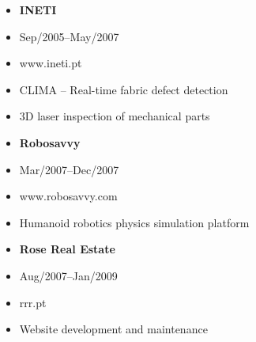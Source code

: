 \documentclass[a4paper,english]{article}
\begin{document}
\noindent
\begin{minipage}[t]{0.5\linewidth}
    \begin{itemize}
    \setlength{\itemsep}{-1mm}
        \item[] {\bf INETI}
        \item[] Sep/2005--May/2007
        \item[] www.ineti.pt
    \end{itemize}
\end{minipage}
\begin{minipage}[t]{0.5\linewidth}
    \begin{itemize}
    \setlength{\itemsep}{-1mm}
        \item[] CLIMA -- Real-time fabric defect detection
        \item[] 3D laser inspection of mechanical parts
    \end{itemize}
\end{minipage}
\vspace{0.5cm}
\begin{minipage}[t]{0.5\linewidth}
    \begin{itemize}
    \setlength{\itemsep}{-1mm}
        \item[] {\bf Robosavvy}
        \item[] Mar/2007--Dec/2007
        \item[] www.robosavvy.com
    \end{itemize}
\end{minipage}
\begin{minipage}[t]{0.5\linewidth}
    \begin{itemize}
    \setlength{\itemsep}{-1mm}
        \item[] Humanoid robotics physics simulation platform
    \end{itemize}
\end{minipage}
\vspace{0.5cm}
\begin{minipage}[t]{0.5\linewidth}
    \begin{itemize}
    \setlength{\itemsep}{-1mm}
        \item[] {\bf Rose Real Estate}
        \item[] Aug/2007--Jan/2009
        \item[] rrr.pt
    \end{itemize}
\end{minipage}
\begin{minipage}[t]{0.5\linewidth}
    \begin{itemize}
    \setlength{\itemsep}{-1mm}
        \item[] Website development and maintenance
    \end{itemize}
\end{minipage}
\end{document}
